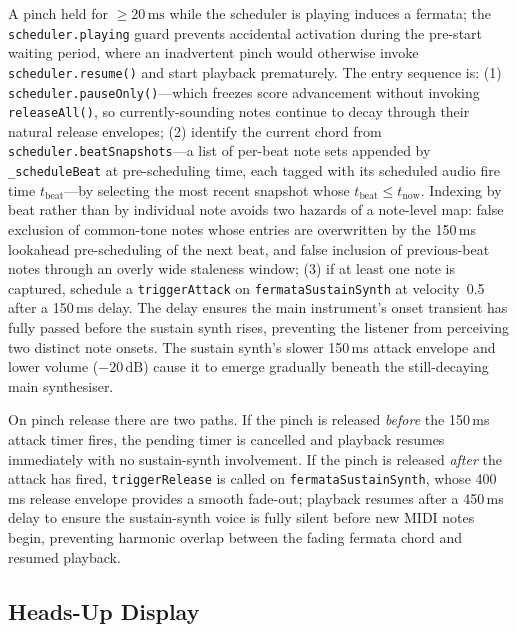 \documentclass[conference]{IEEEtran}
\begin{document}
\noindent A pinch held for $\geq 20\,\text{ms}$ while the scheduler is
playing induces a fermata; the \texttt{scheduler.playing} guard
prevents accidental activation during the pre-start waiting period,
where an inadvertent pinch would otherwise invoke
\texttt{scheduler.resume()} and start playback prematurely.
The entry sequence is: (1) \texttt{scheduler.pauseOnly()}---which
freezes score advancement without invoking \texttt{releaseAll()}, so
currently-sounding notes continue to decay through their natural release
envelopes; (2) identify the current chord from
\texttt{scheduler.beatSnapshots}---a list of per-beat note sets appended
by \texttt{\_scheduleBeat} at pre-scheduling time, each tagged with its
scheduled audio fire time $t_{\text{beat}}$---by selecting the most
recent snapshot whose $t_{\text{beat}} \leq t_{\text{now}}$. Indexing
by beat rather than by individual note avoids two hazards of a
note-level map: false exclusion of common-tone notes whose entries are
overwritten by the 150\,ms lookahead pre-scheduling of the next beat,
and false inclusion of previous-beat notes through an overly wide
staleness window;
(3) if at least one note is captured, schedule a
\texttt{triggerAttack} on \texttt{fermataSustainSynth} at velocity~0.5
after a 150\,ms delay. The delay ensures the main instrument's onset
transient has fully passed before the sustain synth rises, preventing
the listener from perceiving two distinct note onsets. The sustain
synth's slower 150\,ms attack envelope and lower volume ($-20\,\text{dB}$)
cause it to emerge gradually beneath the still-decaying main synthesiser.

On pinch release there are two paths. If the pinch is released
\emph{before} the 150\,ms attack timer fires, the pending timer is
cancelled and playback resumes immediately with no sustain-synth
involvement. If the pinch is released \emph{after} the attack has
fired, \texttt{triggerRelease} is called on
\texttt{fermataSustainSynth}, whose 400\,ms release envelope provides a
smooth fade-out; playback resumes after a 450\,ms delay to ensure the
sustain-synth voice is fully silent before new MIDI notes begin,
preventing harmonic overlap between the fading fermata chord and
resumed playback.



\subsection{Heads-Up Display}
\end{document}
